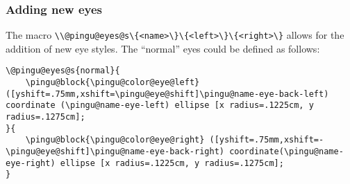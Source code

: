 \documentclass[parskip=half,english,numbers=noenddot,footnotes=nomultiple,oneside]{scrartcl}
\let\say\enquote
\def\ltex#1{\lstinline[style=lstpingu,language=pinguinternallang]'#1'}
\begin{document}
\subsubsection{Adding new eyes}
The macro \ltex{\\@pingu@eyes@s\{<name>\}\{<left>\}\{<right>\}} allows for the addition of new eye styles.
The \say{normal} eyes could be defined as follows:
\begin{lstlisting}[style=lstpingu,language={pinguinternallang}]
\@pingu@eyes@s{normal}{
	\pingu@block{\pingu@color@eye@left} ([yshift=.75mm,xshift=\pingu@eye@shift]\pingu@name-eye-back-left) coordinate (\pingu@name-eye-left) ellipse [x radius=.1225cm, y radius=.1275cm];
}{
	\pingu@block{\pingu@color@eye@right} ([yshift=.75mm,xshift=-\pingu@eye@shift]\pingu@name-eye-back-right) coordinate(\pingu@name-eye-right) ellipse [x radius=.1225cm, y radius=.1275cm];
}
\end{lstlisting}
\printindex
\end{document}
